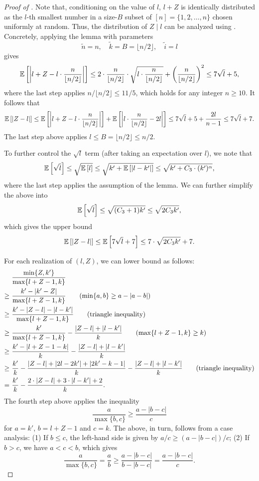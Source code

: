 \begin{proof}[Proof of ]
Note that, conditioning on the value of $l$, $l + Z$ is identically distributed as the $l$-th smallest number in a size-$B$ subset of $[n] = \{1, 2, \ldots, n\}$ chosen uniformly at random. Thus, the distribution of $Z \mid l$ can be analyzed using . Concretely, applying the lemma with parameters
\[
    \tilde n = n, \quad \tilde k = B = \lfloor n/2\rfloor, \quad \tilde i = l
\]
gives
\[
    \operatorname*{\mathbb{E}}_{}\left[\left|l + Z-l\cdot \frac{n}{\lfloor n/2\rfloor}\right|\right]
\le 2\cdot\frac{n}{\lfloor n/2\rfloor}\cdot \sqrt{l\cdot \frac{n}{\lfloor n/2\rfloor}} + \left(\frac{n}{\lfloor n/2\rfloor}\right)^2
\le 7\sqrt{l} + 5,
\]
where the last step applies $n / \lfloor n/2\rfloor \le 11/5$, which holds for any integer $n \ge 10$.
It follows that
\[
    \operatorname*{\mathbb{E}}_{}\left[\left|Z -l\right|\right]
\le \operatorname*{\mathbb{E}}_{}\left[\left|l + Z-l\cdot \frac{n}{\lfloor n/2\rfloor}\right|\right] + \operatorname*{\mathbb{E}}_{}\left[\left|l\cdot \frac{n}{\lfloor n/2\rfloor} - 2l\right|\right] 
\le 7\sqrt{l} + 5 + \frac{2l}{n-1}
\le 7\sqrt{l} + 7.
\]
The last step above applies $l \le B = \lfloor n/2\rfloor \le n/2$.

To further control the $\sqrt{l}$ term (after taking an expectation over $l$), we note that
\[
    \operatorname*{\mathbb{E}}_{}\left[\sqrt{l}\right]
\le \sqrt{\operatorname*{\mathbb{E}}_{}\left[l\right]}
\le \sqrt{k' + \operatorname*{\mathbb{E}}_{}\left[|l - k'|\right]}
\le \sqrt{k' + C_3\cdot(k')^{\alpha}},
\]
where the last step applies the assumption of the lemma. We can further simplify the above into
\[
    \operatorname*{\mathbb{E}}_{}\left[\sqrt{l}\right]
\le \sqrt{(C_3 + 1)k'}
\le \sqrt{2C_3k'},
\]
which gives the upper bound
\[
    \operatorname*{\mathbb{E}}_{}\left[|Z - l|\right]
\le \operatorname*{\mathbb{E}}_{}\left[7\sqrt{l} + 7\right]
\le 7\cdot\sqrt{2C_3k'} + 7.
\]

For each realization of $(l, Z)$, we can lower bound  as follows:
\begin{align*}
        &~\frac{\min\{Z, k'\}}{\max\{l+Z-1, k\}}\\
\ge     &~\frac{k' - |k'-Z|}{\max\{l+Z-1, k\}} \tag{$\min\{a, b\} \ge a - |a - b|$}\\
\ge     &~\frac{k' - |Z - l| - |l - k'|}{\max\{l+Z-1, k\}} \tag{triangle inequality}\\
\ge     &~\frac{k'}{\max\{l+Z-1, k\}}-\frac{|Z - l| + |l - k'|}{k} \tag{$\max\{l+Z-1, k\} \ge k$}\\
\ge     &~\frac{k' - |l+Z-1 -k|}{k}-\frac{|Z - l| + |l - k'|}{k}\\
\ge     &~\frac{k'}{k} - \frac{|Z - l| + |2l - 2k'| + |2k' - k - 1|}{k}-\frac{|Z - l| + |l - k'|}{k} \tag{triangle inequality}\\
=       &~\frac{k'}{ k}-\frac{2\cdot|Z - l| + 3\cdot|l - k'|+2}{k}.
\end{align*}
The fourth step above applies the inequality
\[
    \frac{a}{\max\{b, c\}}
\ge \frac{a - |b - c|}{c}
\]
for $a = k'$, $b = l + Z - 1$ and $c = k$. The above, in turn, follows from a case analysis: (1) If $b \le c$, the left-hand side is given by $a / c \ge (a - |b - c|) / c$; (2) If $b > c$, we have $a < c < b$, which gives
\[
    \frac{a}{\max\{b, c\}}
=   \frac{a}{b}
\ge \frac{a - |b - c|}{b - |b - c|}
=   \frac{a - |b - c|}{c}.
\]


\end{proof}
